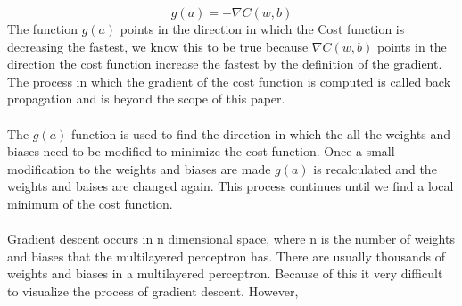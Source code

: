 $$
	g(a) = -\nabla C(w,b)
$$
The function $g(a)$ points in the direction in which the Cost function is decreasing the fastest, we know this to be true because $\nabla C(w,b)$ points in the direction the cost function increase the fastest by the definition of the gradient. The process in which the gradient of the cost function is computed is called back propagation and is beyond the scope of this paper.\\ \\
The $g(a)$ function is used to find the direction in which the all the weights and biases need to be modified to minimize the cost function. Once a small modification to the weights and biases are made $g(a)$ is recalculated and the weights and baises are changed again. This process continues until we find a local minimum of the cost function.\\ \\
Gradient descent occurs in n dimensional space, where n is the number of weights and biases that the multilayered perceptron has. There are usually thousands of weights and biases in a multilayered perceptron. Because of this it very difficult to visualize the process of gradient descent. However, 


